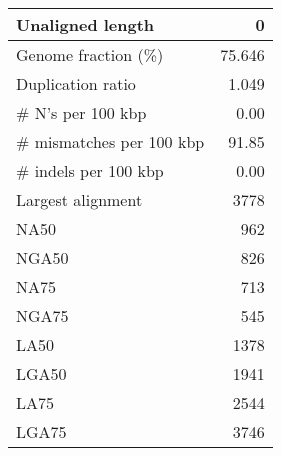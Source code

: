 \documentclass[12pt,a4paper]{article}
\begin{document}
\begin{table}[ht]
\begin{center}
\begin{tabular}{|l*{1}{|r}|}
Unaligned length & 0 \\ \hline
Genome fraction (\%) & 75.646 \\ \hline
Duplication ratio & 1.049 \\ \hline
\# N's per 100 kbp & 0.00 \\ \hline
\# mismatches per 100 kbp & 91.85 \\ \hline
\# indels per 100 kbp & 0.00 \\ \hline
Largest alignment & 3778 \\ \hline
NA50 & 962 \\ \hline
NGA50 & 826 \\ \hline
NA75 & 713 \\ \hline
NGA75 & 545 \\ \hline
LA50 & 1378 \\ \hline
LGA50 & 1941 \\ \hline
LA75 & 2544 \\ \hline
LGA75 & 3746 \\ \hline
\end{tabular}
\end{center}
\end{table}
\end{document}
